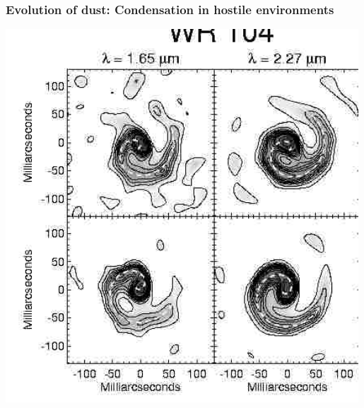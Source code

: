 %
%

\begin{frame}\frametitle{Evolution of dust:
Condensation in hostile environments}

\medskip
\medskip
\medskip
\begin{minipage}[t]{0.55\textwidth}
\begin{center}
\includegraphics[width=0.99\textwidth,height=!]{./D/WR104.jpg}
\end{center}
\end{minipage}
\hfill
\begin{minipage}[t]{0.44\textwidth}
\begin{center}

\end{center}
\end{minipage}
\end{frame}
